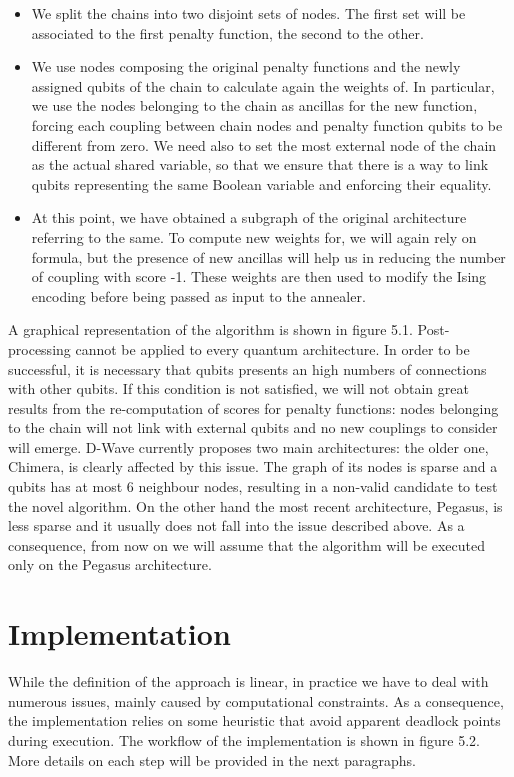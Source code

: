 \begin{itemize}
    \item We split the chains into two disjoint sets of nodes. The first set will be associated to the first penalty function, the second to the other.
    \item We use nodes composing the original penalty functions and the newly assigned qubits of the chain to calculate again the weights of. In particular, we use the nodes belonging to the chain as ancillas for the new function, forcing each coupling between chain nodes and penalty function qubits to be different from zero. We need also to set the most external node of the chain as the actual shared variable, so that we ensure that there is a way to link qubits representing the same Boolean variable and enforcing their equality.
    \item At this point, we have obtained a subgraph of the original architecture referring to the same. To compute new weights for, we will again rely on formula, but the presence of new ancillas will help us in reducing the number of coupling with score -1. These weights are then used to modify the Ising encoding before being passed as input to the annealer.
\end{itemize}

A graphical representation of the algorithm is shown in figure 5.1.
Post-processing cannot be applied to every quantum architecture. In order to be successful, it is necessary that qubits presents an high numbers of connections with other qubits. If this condition is not satisfied, we will not obtain great results from the re-computation of scores for penalty functions: nodes belonging to the chain will not link with external qubits and no new couplings to consider will emerge. D-Wave currently proposes two main architectures: the older one, Chimera, is clearly affected by this issue. The graph of its nodes is sparse and a qubits has at most 6 neighbour nodes, resulting in a non-valid candidate to test the novel algorithm. On the other hand the most recent architecture, Pegasus, is less sparse and it usually does not fall into the issue described above. As a consequence, from now on we will assume that the algorithm will be executed only on the Pegasus architecture.


\section{Implementation}

While the definition of the approach is linear, in practice we have to deal with numerous issues, mainly caused by computational constraints. As a consequence, the implementation relies on some heuristic that avoid apparent deadlock points during execution.
The workflow of the implementation is shown in figure 5.2.
More details on each step will be provided in the next paragraphs.

